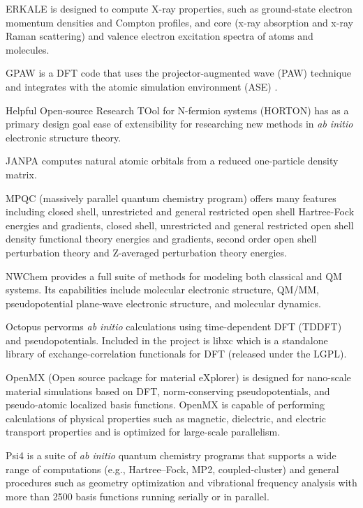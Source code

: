 ERKALE \cite{Lehtola_2012} is designed to compute X-ray properties, such as ground-state electron momentum densities and Compton profiles, and core (x-ray absorption and x-ray Raman scattering) and valence electron excitation spectra of atoms and molecules.

GPAW \cite{gpaw} is a DFT code that uses the projector-augmented wave (PAW) technique \cite{Bl_chl_1994,Kresse_1999} and integrates with the  atomic simulation environment (ASE)  \cite{Bahn_2002}. 

Helpful Open-source Research TOol for N-fermion systems (HORTON) has as a primary design goal ease of extensibility for researching new methods in \textit{ab initio} electronic structure theory.

JANPA \cite{Nikolaienko_2014} computes natural atomic orbitals from a reduced one-particle density matrix.

MPQC (massively parallel quantum chemistry program) \cite{Janssen95} offers many features including closed shell, unrestricted and general restricted open shell Hartree-Fock energies and gradients, closed shell, unrestricted and general restricted open shell density functional theory energies and gradients, second order open shell perturbation theory and Z-averaged perturbation theory energies.

NWChem \cite{Valiev_2010} provides a full suite of methods for modeling both classical and QM systems. Its capabilities include molecular electronic structure, QM/MM, pseudopotential plane-wave electronic structure, and molecular dynamics.

Octopus pervorms \textit{ab initio} calculations using time-dependent DFT (TDDFT) and pseudopotentials.  Included in the project is libxc \cite{Marques_2012} which is a standalone library of exchange-correlation functionals for DFT (released under the LGPL).

OpenMX (Open source package for material eXplorer) \cite{Ozaki_2005} is designed for nano-scale material simulations based on DFT, norm-conserving pseudopotentials, and pseudo-atomic localized basis functions. OpenMX is capable of performing calculations of physical properties such as magnetic, dielectric, and electric transport properties and is optimized for large-scale parallelism.

Psi4 \cite{Turney_2011} is a suite of \textit{ab initio} quantum chemistry programs that supports a wide range of computations (e.g., Hartree–Fock, MP2, coupled-cluster) and general procedures such as geometry optimization and vibrational frequency analysis with more than 2500 basis functions running serially or in parallel.

